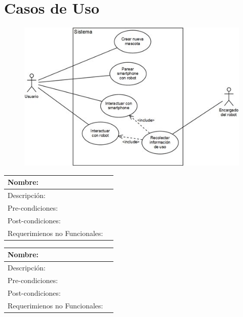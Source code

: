 \documentclass[letterpaper,12pt]{article} %
\numberwithin{equation}{section} %
\numberwithin{figure}{section} %
\numberwithin{table}{section} %
\begin{document}
\newpage
\section{Casos de Uso} %

\begin{figure}
   \centering
     \includegraphics[scale=0.5]{CasoUso.jpg}
   \caption{}
   \label{fig:CasoUso}
\end{figure}


\begin{table}[hb!]
  \begin{tabular}{p{3cm}p{7cm}}\hline\hline
    Nombre: &  \\ \hline
    Descripci\'on: & \\ \hline %
    Pre-condiciones: & \\ \hline
    Post-condiciones: & \\ \hline
    Requerimienos no Funcionales: & \\ \hline\hline %
  \end{tabular}
\end{table}

\begin{table}[hb!]
  \begin{tabular}{p{3cm}p{7cm}}\hline\hline
    Nombre: &  \\ \hline
    Descripci\'on: & \\ \hline %
    Pre-condiciones: & \\ \hline
    Post-condiciones: & \\ \hline
    Requerimienos no Funcionales: & \\ \hline\hline %
  \end{tabular}
\end{table}
\end{document}
